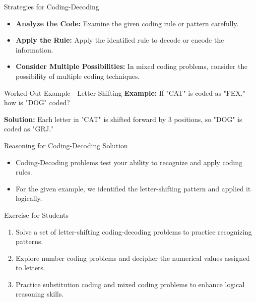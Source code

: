 \begin{frame}{Strategies for Coding-Decoding}
  \begin{itemize}
    \item \textbf{Analyze the Code:} Examine the given coding rule or pattern carefully.
    \item \textbf{Apply the Rule:} Apply the identified rule to decode or encode the information.
    \item \textbf{Consider Multiple Possibilities:} In mixed coding problems, consider the possibility of multiple coding techniques.
  \end{itemize}
\end{frame}

\begin{frame}{Worked Out Example - Letter Shifting}
  \textbf{Example:} If "CAT" is coded as "FEX," how is "DOG" coded?

  \textbf{Solution:} Each letter in "CAT" is shifted forward by 3 positions, so "DOG" is coded as "GRJ."
\end{frame}

\begin{frame}{Reasoning for Coding-Decoding Solution}
  \begin{itemize}
    \item Coding-Decoding problems test your ability to recognize and apply coding rules.
    \item For the given example, we identified the letter-shifting pattern and applied it logically.
  \end{itemize}
\end{frame}

\begin{frame}{Exercise for Students}
  \begin{enumerate}
    \item Solve a set of letter-shifting coding-decoding problems to practice recognizing patterns.
    \item Explore number coding problems and decipher the numerical values assigned to letters.
    \item Practice substitution coding and mixed coding problems to enhance logical reasoning skills.
  \end{enumerate}
\end{frame}
